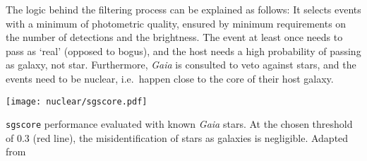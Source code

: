 The logic behind the filtering process can be explained as follows: It selects events with a minimum of photometric quality, ensured by minimum requirements on the number of detections and the brightness. The event at least once needs to pass as `real' (opposed to bogus), and the host needs a high probability of passing as galaxy, not star. Furthermore, \textit{Gaia} is consulted to veto against stars, and the events need to be nuclear, i.e.~happen close to the core of their host galaxy.

\begin{marginfigure}
    \texttt{[image: nuclear/sgscore.pdf]}
    \caption[\texttt{sgscore} performance]{\texttt{sgscore} performance evaluated with known \textit{Gaia} stars. At the chosen threshold of 0.3 (red line), the misidentification of stars as galaxies is negligible. Adapted from~\cite{Tachibana2018}}
\end{marginfigure}

